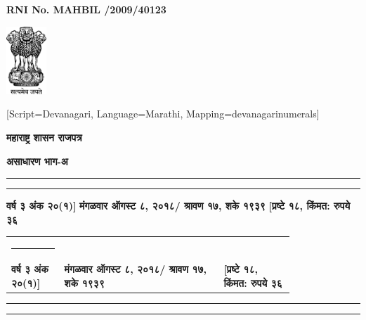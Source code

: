 \documentclass{report}
\begin{document}
\pagestyle{empty}
\begin{flushright}
  \textbf{RNI No. MAHBIL /2009/40123}
\end{flushright}


\newcommand{\rowstyle}[1]{{\small \bfseries #1}}
\begin{center}
  \includegraphics[width=1.5cm]{indiaemblem}

  \vskip 40pt

[Script=Devanagari, Language=Marathi, Mapping=devanagarinumerals]

{\Huge \bfseries महाराष्ट्र शासन राजपत्र}

  \vskip 20pt

{\Large \bfseries असाधारण भाग-अ}

\rule{\linewidth}{2pt}
\rule{\linewidth}{0.5pt}

  \rowstyle{वर्ष ३ अंक २०(१)]} \hspace{\fill}
  \rowstyle{मंगळवार ऑगस्ट ८, २०१८/ श्रावण १७, शके १९३९} 
  \hspace{\fill}
  \rowstyle{ [प्रष्टे १८, किंमत: रुपये ३६} 

\begin{tabular}{p{0.15\linewidth}p{0.45\linewidth}p{0.2\linewidth}}
\hrule \\
  \rowstyle{वर्ष ३ अंक २०(१)]} & %
  \rowstyle{मंगळवार ऑगस्ट ८, २०१८/ श्रावण १७, शके १९३९} &
  \rowstyle{ [प्रष्टे १८, किंमत: रुपये ३६} \\
\end{tabular}

\rule{\linewidth}{0.5pt}
\rule{\linewidth}{2pt}

\end{center}
\end{document}

